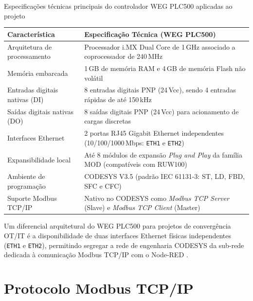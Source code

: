 \begin{quadro}[htb]
  \centering
  \SingleSpacing
  \caption{Especificações técnicas principais do controlador WEG PLC500 aplicadas ao projeto}
  \label{quadro:spec_plc500}
  \footnotesize
  \begin{tabularx}{\textwidth}{|p{4.6cm}|L|}
    \hline
    \textbf{Característica} & \textbf{Especificação Técnica (WEG PLC500)} \\
    \hline
    Arquitetura de processamento & Processador i.MX Dual Core de 1\,GHz associado a coprocessador de 240\,MHz \\
    \hline
    Memória embarcada & 1\,GB de memória RAM e 4\,GB de memória Flash não volátil \\
    \hline
    Entradas digitais nativas (DI) & 8 entradas digitais PNP (24\,Vcc), sendo 4 entradas rápidas de até 150\,kHz \\
    \hline
    Saídas digitais nativas (DO) & 8 saídas digitais PNP (24\,Vcc) para acionamento de cargas discretas \\
    \hline
    Interfaces Ethernet & 2 portas RJ45 Gigabit Ethernet independentes (10/100/1000\,Mbps: \texttt{ETH1} e \texttt{ETH2}) \\
    \hline
    Expansibilidade local & Até 8 módulos de expansão \textit{Plug and Play} da família MOD (compatíveis com RUW100) \\
    \hline
    Ambiente de programação & CODESYS V3.5 (padrão IEC 61131-3: ST, LD, FBD, SFC e CFC) \\
    \hline
    Suporte Modbus TCP/IP & Nativo no CODESYS como \textit{Modbus TCP Server} (Slave) e \textit{Modbus TCP Client} (Master) \\
    \hline
  \end{tabularx}
\end{quadro}

Um diferencial arquitetural do WEG PLC500 para projetos de convergência OT/IT é a disponibilidade de duas interfaces Ethernet físicas independentes (\texttt{ETH1} e \texttt{ETH2}), permitindo segregar a rede de engenharia CODESYS da sub-rede dedicada à comunicação Modbus TCP/IP com o Node-RED \cite{weg_plc500_modbus, stouffer_nist_ot}.

\section{Protocolo Modbus TCP/IP}
\label{sec:fund_modbus}

